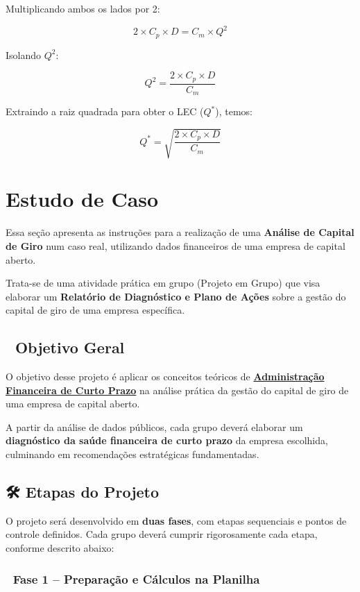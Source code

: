 \documentclass[
  a4paper,
]{book}
\begin{document}
Multiplicando ambos os lados por 2:

\[
2 \times C_p \times D = C_m \times Q^2
\]

Isolando \(Q^2\):

\[
Q^2 = \frac{2 \times C_p \times D}{C_m}
\]

Extraindo a raiz quadrada para obter o LEC (\(Q^*\)), temos:

\[
Q^* = \sqrt{\frac{2 \times C_p \times D}{C_m}}
\]


\chapter{Estudo de Caso}\label{sec-aval}

Essa seção apresenta as instruções para a realização de uma
\textbf{Análise de Capital de Giro} num caso real, utilizando dados
financeiros de uma empresa de capital aberto.

Trata-se de uma atividade prática em grupo (Projeto em Grupo) que visa
elaborar um \textbf{Relatório de Diagnóstico e Plano de Ações} sobre a
gestão do capital de giro de uma empresa específica.

\section{🎯 Objetivo Geral}\label{objetivo-geral}

O objetivo desse projeto é aplicar os conceitos teóricos de
\hyperref[sec-giro]{\textbf{Administração Financeira de Curto Prazo}} na
análise prática da gestão do capital de giro de uma empresa de capital
aberto.

A partir da análise de dados públicos, cada grupo deverá elaborar um
\textbf{diagnóstico da saúde financeira de curto prazo} da empresa
escolhida, culminando em recomendações estratégicas fundamentadas.

\section{🛠️ Etapas do Projeto}\label{etapas-do-projeto}

O projeto será desenvolvido em \textbf{duas fases}, com etapas
sequenciais e pontos de controle definidos. Cada grupo deverá cumprir
rigorosamente cada etapa, conforme descrito abaixo:

\subsection{📌 Fase 1 -- Preparação e Cálculos na
Planilha}\label{fase-1-preparauxe7uxe3o-e-cuxe1lculos-na-planilha}
\end{document}
